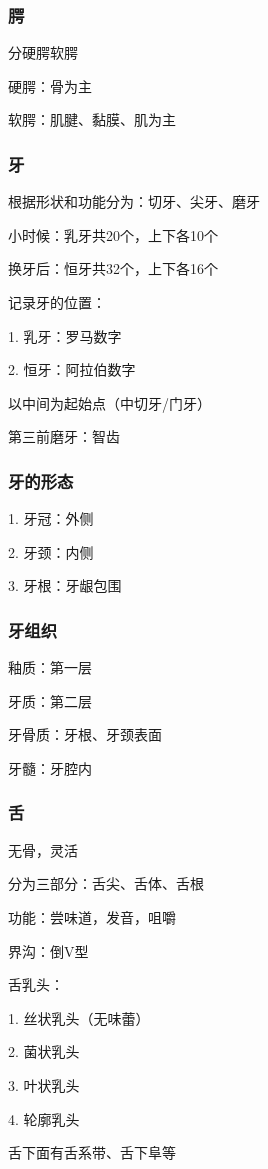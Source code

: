 \subsubsection{腭}%
\label{subsub:腭}
分硬腭软腭

硬腭：骨为主

软腭：肌腱、黏膜、肌为主
\subsubsection{牙}%
\label{subsub:牙}
根据形状和功能分为：切牙、尖牙、磨牙

小时候：乳牙共20个，上下各10个

换牙后：恒牙共32个，上下各16个
\begin{notation}
    记录牙的位置：

    1. 乳牙：罗马数字

    2. 恒牙：阿拉伯数字

    以中间为起始点（中切牙/门牙）
\end{notation}
\begin{eg}
    第三前磨牙：智齿
\end{eg}
\subsubsection*{牙的形态}%
\label{subsub:牙的形态}
1. 牙冠：外侧

2. 牙颈：内侧

3. 牙根：牙龈包围
\subsubsection*{牙组织}%
\label{subsub:牙组织}
釉质：第一层

牙质：第二层

牙骨质：牙根、牙颈表面

牙髓：牙腔内
\subsubsection{舌}%
\label{subsub:舌}
无骨，灵活

分为三部分：舌尖、舌体、舌根

功能：尝味道，发音，咀嚼
\begin{notation}
    界沟：倒V型
\end{notation}
\begin{notation}
    舌乳头：

    1. 丝状乳头（无味蕾）

    2. 菌状乳头

    3. 叶状乳头

    4. 轮廓乳头
\end{notation}
\begin{notation}
    舌下面有舌系带、舌下阜等
\end{notation}
